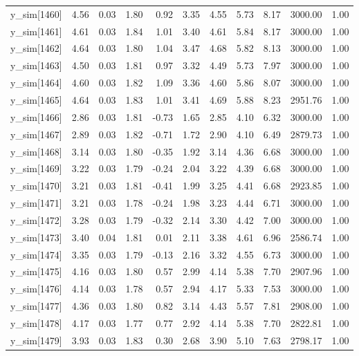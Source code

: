 \begin{table}[ht]
\begin{tabular}{rrrrrrrrrrr}
  y\_sim[1460] & 4.56 & 0.03 & 1.80 & 0.92 & 3.35 & 4.55 & 5.73 & 8.17 & 3000.00 & 1.00 \\ 
  y\_sim[1461] & 4.61 & 0.03 & 1.84 & 1.01 & 3.40 & 4.61 & 5.84 & 8.17 & 3000.00 & 1.00 \\ 
  y\_sim[1462] & 4.64 & 0.03 & 1.80 & 1.04 & 3.47 & 4.68 & 5.82 & 8.13 & 3000.00 & 1.00 \\ 
  y\_sim[1463] & 4.50 & 0.03 & 1.81 & 0.97 & 3.32 & 4.49 & 5.73 & 7.97 & 3000.00 & 1.00 \\ 
  y\_sim[1464] & 4.60 & 0.03 & 1.82 & 1.09 & 3.36 & 4.60 & 5.86 & 8.07 & 3000.00 & 1.00 \\ 
  y\_sim[1465] & 4.64 & 0.03 & 1.83 & 1.01 & 3.41 & 4.69 & 5.88 & 8.23 & 2951.76 & 1.00 \\ 
  y\_sim[1466] & 2.86 & 0.03 & 1.81 & -0.73 & 1.65 & 2.85 & 4.10 & 6.32 & 3000.00 & 1.00 \\ 
  y\_sim[1467] & 2.89 & 0.03 & 1.82 & -0.71 & 1.72 & 2.90 & 4.10 & 6.49 & 2879.73 & 1.00 \\ 
  y\_sim[1468] & 3.14 & 0.03 & 1.80 & -0.35 & 1.92 & 3.14 & 4.36 & 6.68 & 3000.00 & 1.00 \\ 
  y\_sim[1469] & 3.22 & 0.03 & 1.79 & -0.24 & 2.04 & 3.22 & 4.39 & 6.68 & 3000.00 & 1.00 \\ 
  y\_sim[1470] & 3.21 & 0.03 & 1.81 & -0.41 & 1.99 & 3.25 & 4.41 & 6.68 & 2923.85 & 1.00 \\ 
  y\_sim[1471] & 3.21 & 0.03 & 1.78 & -0.24 & 1.98 & 3.23 & 4.44 & 6.71 & 3000.00 & 1.00 \\ 
  y\_sim[1472] & 3.28 & 0.03 & 1.79 & -0.32 & 2.14 & 3.30 & 4.42 & 7.00 & 3000.00 & 1.00 \\ 
  y\_sim[1473] & 3.40 & 0.04 & 1.81 & 0.01 & 2.11 & 3.38 & 4.61 & 6.96 & 2586.74 & 1.00 \\ 
  y\_sim[1474] & 3.35 & 0.03 & 1.79 & -0.13 & 2.16 & 3.32 & 4.55 & 6.73 & 3000.00 & 1.00 \\ 
  y\_sim[1475] & 4.16 & 0.03 & 1.80 & 0.57 & 2.99 & 4.14 & 5.38 & 7.70 & 2907.96 & 1.00 \\ 
  y\_sim[1476] & 4.14 & 0.03 & 1.78 & 0.57 & 2.94 & 4.17 & 5.33 & 7.53 & 3000.00 & 1.00 \\ 
  y\_sim[1477] & 4.36 & 0.03 & 1.80 & 0.82 & 3.14 & 4.43 & 5.57 & 7.81 & 2908.00 & 1.00 \\ 
  y\_sim[1478] & 4.17 & 0.03 & 1.77 & 0.77 & 2.92 & 4.14 & 5.38 & 7.70 & 2822.81 & 1.00 \\ 
  y\_sim[1479] & 3.93 & 0.03 & 1.83 & 0.30 & 2.68 & 3.90 & 5.10 & 7.63 & 2798.17 & 1.00 \\ 

\end{tabular}
\end{table}
